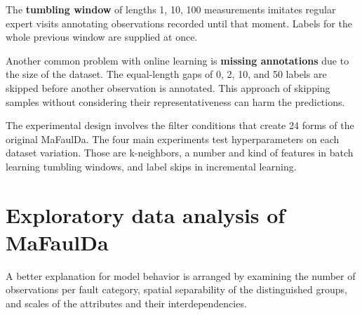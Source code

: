 \begin{itemize}
The \textbf{tumbling window} of lengths 1, 10, 100 measurements imitates regular expert visits annotating observations recorded until that moment. Labels for the whole previous window are supplied at once.

Another common problem with online learning is \textbf{missing annotations} due to the size of the dataset. The equal-length gaps of 0, 2, 10, and 50 labels are skipped before another observation is annotated. This approach of skipping samples without considering their representativeness can harm the predictions. 
\end{itemize}

The experimental design involves the filter conditions that create 24 forms of the original MaFaulDa. The four main experiments test hyperparameters on each dataset variation. Those are k-neighbors, a number and kind of features in batch learning tumbling windows, and label skips in incremental learning.

\section{Exploratory data analysis of MaFaulDa}
A better explanation for model behavior is arranged by examining the number of observations per fault category, spatial separability of the distinguished groups, and scales of the attributes and their interdependencies.

